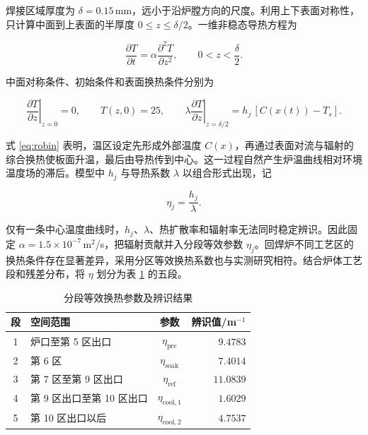 焊接区域厚度为 $\delta=0.15\,$mm，远小于沿炉膛方向的尺度。利用上下表面对称性，只计算中面到上表面的半厚度 $0\le z\le\delta/2$。一维非稳态导热方程为\cite{eftychiou1993}

\begin{equation}
  \frac{\partial T}{\partial t}
  =\alpha\frac{\partial^2T}{\partial z^2},
  \qquad 0<z<\frac{\delta}{2}.
  \label{eq:pde}
\end{equation}

中面对称条件、初始条件和表面换热条件分别为

\begin{equation}
  \left.\frac{\partial T}{\partial z}\right|_{z=0}=0,
  \qquad T(z,0)=25,
  \qquad
  \lambda\left.\frac{\partial T}{\partial z}\right|_{z=\delta/2}
  =h_j\,[C(x(t))-T_s].
  \label{eq:robin}
\end{equation}

式 \eqref{eq:robin} 表明，温区设定先形成外部温度 $C(x)$，再通过表面对流与辐射的综合换热使板面升温，最后由导热传到中心。这一过程自然产生炉温曲线相对环境温度场的滞后。模型中 $h_j$ 与导热系数 $\lambda$ 以组合形式出现，记

\begin{equation}
  \eta_j=\frac{h_j}{\lambda}.
\end{equation}

仅有一条中心温度曲线时，$h_j$、$\lambda$、热扩散率和辐射率无法同时稳定辨识。因此固定 $\alpha=1.5\times10^{-7}\,$m$^2$/s，把辐射贡献并入分段等效参数 $\eta_j$。回焊炉不同工艺区的换热条件存在显著差异，采用分区等效换热系数也与实测研究相符\cite{illes2010}。结合炉体工艺段和残差分布，将 $\eta$ 划分为表 \ref{tab:eta} 的五段。

\begin{table}[htbp]
  \centering
  \caption{分段等效换热参数及辨识结果}
  \label{tab:eta}
  \small
  \begin{tabular}{clcr}
    \toprule
    段 & 空间范围 & 参数 & 辨识值/m$^{-1}$ \\
    \midrule
    1 & 炉口至第 5 区出口 & $\eta_{\mathrm{pre}}$ & $9.4783$ \\
    2 & 第 6 区 & $\eta_{\mathrm{soak}}$ & $7.4014$ \\
    3 & 第 7 区至第 9 区出口 & $\eta_{\mathrm{ref}}$ & $11.0839$ \\
    4 & 第 9 区出口至第 10 区出口 & $\eta_{\mathrm{cool,1}}$ & $1.6029$ \\
    5 & 第 10 区出口以后 & $\eta_{\mathrm{cool,2}}$ & $4.7537$ \\
    \bottomrule
  \end{tabular}
\end{table}

